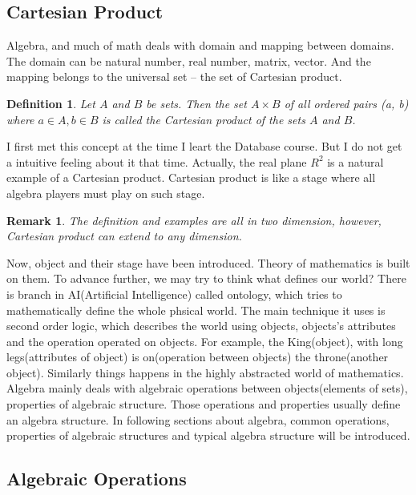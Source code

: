 \documentclass[a4paper]{book}
\newtheorem{definition}{Definition}[section]
\newtheorem{remark}{Remark}[section]
\begin{document}
    \subsection{Cartesian Product}

    Algebra, and much of math deals with domain and mapping between domains.
    The domain can be natural number, real number, matrix, vector. And the
    mapping belongs to the universal set -- the set of Cartesian product.

    \begin{definition}
      Let $A$ and $B$ be sets. Then the set $A \times B$ of all ordered
      pairs (a, b) where $a \in A, b \in B$ is called the Cartesian product
      of the sets $A$ and $B$.
    \end{definition}

    I first met this concept at the time I leart the Database course.
    But I do not get a intuitive feeling about it that time. Actually,
    the real plane $R^2$ is a natural example of a Cartesian product.
    Cartesian product is like a stage where all algebra players must
    play on such stage.

    \begin{remark}
      The definition and examples are all in two dimension, however,
      Cartesian product can extend to any dimension.
    \end{remark}

    Now, object and their stage have been introduced. Theory of
    mathematics is built on them. To advance further, we may try to
    think what defines our world? There is branch in AI(Artificial
    Intelligence) called ontology, which tries to mathematically define
    the whole phsical world. The main technique it uses is second order
    logic, which describes the world using objects, objects's attributes
    and the operation operated on objects. For example, the
    King(object), with long legs(attributes of object) is on(operation
    between objects) the throne(another object).  Similarly things
    happens in the highly abstracted world of mathematics. Algebra
    mainly deals with algebraic operations between objects(elements of
    sets), properties of algebraic structure. Those operations and
    properties usually define an algebra structure. In following
    sections about algebra, common operations, properties of algebraic
    structures and typical algebra structure will be introduced.

    \subsection{Algebraic Operations}
\end{document}
